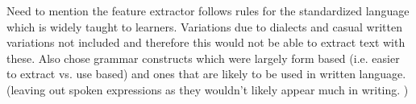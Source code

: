 Need to mention the feature extractor follows rules for the standardized language which is widely taught to
learners. Variations due to dialects and casual written variations not included and therefore this would not be
able to extract text with these. Also chose grammar constructs which were largely form based (i.e. easier to extract
vs. use based) and ones that are likely to be used in written language. (leaving out spoken expressions as they
wouldn't likely appear much in writing. )